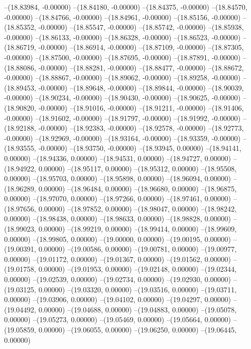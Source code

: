 --(18.83984, -0.00000)
--(18.84180, -0.00000)
--(18.84375, -0.00000)
--(18.84570, -0.00000)
--(18.84766, -0.00000)
--(18.84961, -0.00000)
--(18.85156, -0.00000)
--(18.85352, -0.00000)
--(18.85547, -0.00000)
--(18.85742, -0.00000)
--(18.85938, -0.00000)
--(18.86133, -0.00000)
--(18.86328, -0.00000)
--(18.86523, -0.00000)
--(18.86719, -0.00000)
--(18.86914, -0.00000)
--(18.87109, -0.00000)
--(18.87305, -0.00000)
--(18.87500, -0.00000)
--(18.87695, -0.00000)
--(18.87891, -0.00000)
--(18.88086, -0.00000)
--(18.88281, -0.00000)
--(18.88477, -0.00000)
--(18.88672, -0.00000)
--(18.88867, -0.00000)
--(18.89062, -0.00000)
--(18.89258, -0.00000)
--(18.89453, -0.00000)
--(18.89648, -0.00000)
--(18.89844, -0.00000)
--(18.90039, -0.00000)
--(18.90234, -0.00000)
--(18.90430, -0.00000)
--(18.90625, -0.00000)
--(18.90820, -0.00000)
--(18.91016, -0.00000)
--(18.91211, -0.00000)
--(18.91406, -0.00000)
--(18.91602, -0.00000)
--(18.91797, -0.00000)
--(18.91992, -0.00000)
--(18.92188, -0.00000)
--(18.92383, -0.00000)
--(18.92578, -0.00000)
--(18.92773, -0.00000)
--(18.92969, -0.00000)
--(18.93164, -0.00000)
--(18.93359, -0.00000)
--(18.93555, -0.00000)
--(18.93750, -0.00000)
--(18.93945, 0.00000)
--(18.94141, 0.00000)
--(18.94336, 0.00000)
--(18.94531, 0.00000)
--(18.94727, 0.00000)
--(18.94922, 0.00000)
--(18.95117, 0.00000)
--(18.95312, 0.00000)
--(18.95508, 0.00000)
--(18.95703, 0.00000)
--(18.95898, 0.00000)
--(18.96094, 0.00000)
--(18.96289, 0.00000)
--(18.96484, 0.00000)
--(18.96680, 0.00000)
--(18.96875, 0.00000)
--(18.97070, 0.00000)
--(18.97266, 0.00000)
--(18.97461, 0.00000)
--(18.97656, 0.00000)
--(18.97852, 0.00000)
--(18.98047, 0.00000)
--(18.98242, 0.00000)
--(18.98438, 0.00000)
--(18.98633, 0.00000)
--(18.98828, 0.00000)
--(18.99023, 0.00000)
--(18.99219, 0.00000)
--(18.99414, 0.00000)
--(18.99609, 0.00000)
--(18.99805, 0.00000)
--(19.00000, 0.00000)
--(19.00195, 0.00000)
--(19.00391, 0.00000)
--(19.00586, 0.00000)
--(19.00781, 0.00000)
--(19.00977, 0.00000)
--(19.01172, 0.00000)
--(19.01367, 0.00000)
--(19.01562, 0.00000)
--(19.01758, 0.00000)
--(19.01953, 0.00000)
--(19.02148, 0.00000)
--(19.02344, 0.00000)
--(19.02539, 0.00000)
--(19.02734, 0.00000)
--(19.02930, 0.00000)
--(19.03125, 0.00000)
--(19.03320, 0.00000)
--(19.03516, 0.00000)
--(19.03711, 0.00000)
--(19.03906, 0.00000)
--(19.04102, 0.00000)
--(19.04297, 0.00000)
--(19.04492, 0.00000)
--(19.04688, 0.00000)
--(19.04883, 0.00000)
--(19.05078, 0.00000)
--(19.05273, 0.00000)
--(19.05469, 0.00000)
--(19.05664, 0.00000)
--(19.05859, 0.00000)
--(19.06055, 0.00000)
--(19.06250, 0.00000)
--(19.06445, 0.00000)
